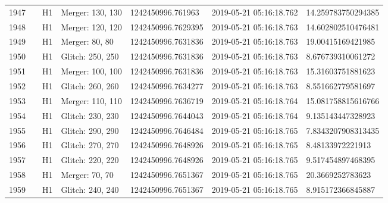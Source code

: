\begin{longtable}{lllllll}
1947 &                                                    &       H1 &  Merger: 130, 130 &   1242450996.761963 &  2019-05-21 05:16:18.762 &  14.259783750294385 \\
1948 &                                                    &       H1 &  Merger: 120, 120 &  1242450996.7629395 &  2019-05-21 05:16:18.763 &  14.602802510476481 \\
1949 &                                                    &       H1 &    Merger: 80, 80 &  1242450996.7631836 &  2019-05-21 05:16:18.763 &   19.00415169421985 \\
1950 &                                                    &       H1 &  Glitch: 250, 250 &  1242450996.7631836 &  2019-05-21 05:16:18.763 &   8.676739310061272 \\
1951 &                                                    &       H1 &  Merger: 100, 100 &  1242450996.7631836 &  2019-05-21 05:16:18.763 &   15.31603751881623 \\
1952 &                                                    &       H1 &  Glitch: 260, 260 &  1242450996.7634277 &  2019-05-21 05:16:18.763 &   8.551662779581697 \\
1953 &                                                    &       H1 &  Merger: 110, 110 &  1242450996.7636719 &  2019-05-21 05:16:18.764 &  15.081758815616766 \\
1954 &                                                    &       H1 &  Glitch: 230, 230 &  1242450996.7644043 &  2019-05-21 05:16:18.764 &   9.135143447328923 \\
1955 &                                                    &       H1 &  Glitch: 290, 290 &  1242450996.7646484 &  2019-05-21 05:16:18.765 &  7.8343207908313435 \\
1956 &                                                    &       H1 &  Glitch: 270, 270 &  1242450996.7648926 &  2019-05-21 05:16:18.765 &    8.48133972221913 \\
1957 &                                                    &       H1 &  Glitch: 220, 220 &  1242450996.7648926 &  2019-05-21 05:16:18.765 &   9.517454897468395 \\
1958 &                                                    &       H1 &    Merger: 70, 70 &  1242450996.7651367 &  2019-05-21 05:16:18.765 &    20.3669252783623 \\
1959 &                                                    &       H1 &  Glitch: 240, 240 &  1242450996.7651367 &  2019-05-21 05:16:18.765 &   8.915172366845887 \\

\end{longtable}
